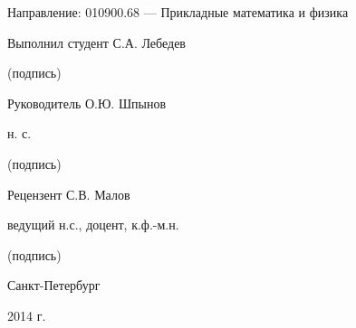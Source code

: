 \begin{titlepage}
  \par\bigskip
  \par\bigskip

  Направление: \hfill 010900.68 --- Прикладные математика и физика

  \par\bigskip
  \par\bigskip

  Выполнил студент \hfill С.А. Лебедев

  {\scriptsize
    \begin{center}
      (подпись)
    \end{center}
  }

  Руководитель \hfill О.Ю. Шпынов

  {\scriptsize н. с.
    \begin{center}
      (подпись)
    \end{center}
  }

  \par\bigskip

  Рецензент \hfill С.В. Малов

  {\scriptsize ведущий н.с., доцент, к.ф.-м.н.
    \begin{center}
      (подпись)
    \end{center}
  }

  \vfill

  \begin{center}
    Санкт-Петербург

    2014 г.
  \end{center}

  \normalsize

  \newpage
\end{titlepage}
